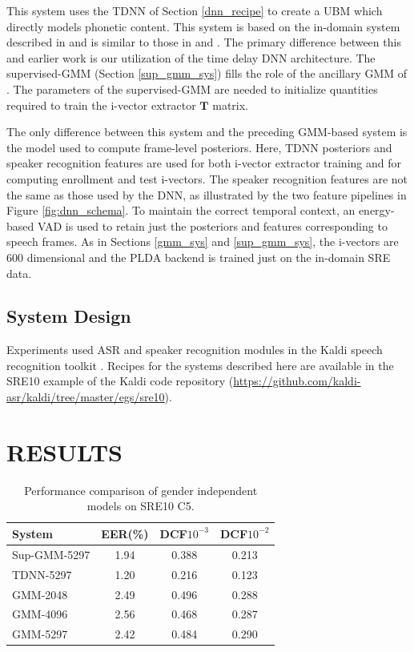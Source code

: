\documentclass{article}
\begin{document}
This system 
uses the TDNN of Section \ref{dnn_recipe} 
to create a UBM which directly models phonetic content.
This system is based on the in-domain system described in 
\cite{garcia2014} and is similar to
those in \cite{lei2014} and \cite{kenny2014deep}.
The primary difference between this and earlier work
is our utilization of the time delay DNN architecture.
The supervised-GMM (Section \ref{sup_gmm_sys}) fills the role
of the ancillary GMM of \cite{garcia2014}.
The parameters of the supervised-GMM are needed to 
initialize quantities required to train the
i-vector extractor $\boldsymbol{T}$ matrix. 

 
The only difference between this system and the preceding
GMM-based system is the model used to compute frame-level posteriors.
Here, TDNN posteriors and speaker recognition features are used for both
i-vector extractor training and for computing enrollment and
test i-vectors.
The speaker recognition features are not the same as those used
by the DNN, as illustrated by the two 
feature pipelines in Figure \ref{fig:dnn_schema}.
 To maintain the correct temporal context,
an energy-based VAD is used to retain
just the posteriors and features corresponding to speech frames.
As in Sections \ref{gmm_sys} and \ref{sup_gmm_sys},
the i-vectors are 600 dimensional and the PLDA
backend is trained just on the in-domain SRE data.

\subsection{System Design}
Experiments used ASR and speaker recognition modules in the
Kaldi speech recognition toolkit \cite{kaldi}. Recipes for
the systems described here are available in the SRE10
example of the Kaldi code repository 
(\href{https://github.com/kaldi-asr/kaldi/tree/master/egs/sre10}{https://github.com/kaldi-asr/kaldi/tree/master/egs/sre10}).

\section{RESULTS}
\begin{table}
\begin{center}
\begin{tabular}{l|ccc}
\hline
System & EER(\%) & DCF$10^{-3}$ & DCF$10^{-2}$ \\ \hline \hline
Sup-GMM-5297 & 1.94 & 0.388 & 0.213 \\
TDNN-5297 & 1.20 & 0.216 & 0.123 \\
GMM-2048 & 2.49 & 0.496 & 0.288 \\
GMM-4096 & 2.56 & 0.468 & 0.287 \\
GMM-5297 & 2.42 & 0.484 & 0.290 \\ \hline
\end{tabular}
\end{center}
\caption{Performance comparison of gender independent models on SRE10 C5.}
\label{gender_ind}
\end{table}
\end{document}
